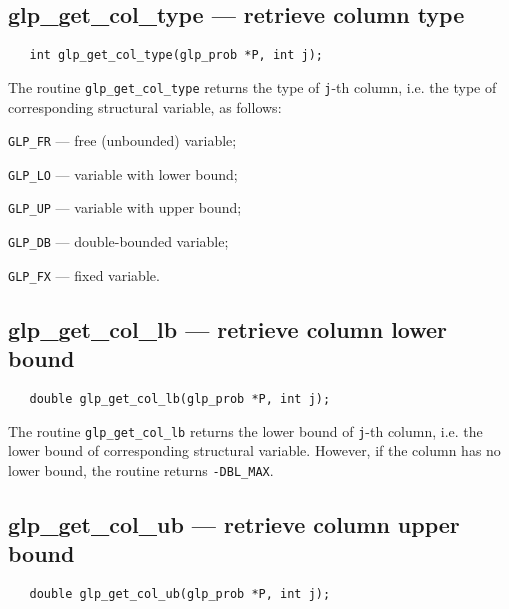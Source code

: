 \vspace*{-4pt}

\subsection{glp\_get\_col\_type --- retrieve column type}

\synopsis

\begin{verbatim}
   int glp_get_col_type(glp_prob *P, int j);
\end{verbatim}

\returns

The routine \verb|glp_get_col_type| returns the type of \verb|j|-th
column, i.e. the type of corresponding structural variable, as follows:

\verb|GLP_FR| --- free (unbounded) variable;

\verb|GLP_LO| --- variable with lower bound;

\verb|GLP_UP| --- variable with upper bound;

\verb|GLP_DB| --- double-bounded variable;

\verb|GLP_FX| --- fixed variable.

\vspace*{-4pt}

\subsection{glp\_get\_col\_lb --- retrieve column lower bound}

\synopsis

\begin{verbatim}
   double glp_get_col_lb(glp_prob *P, int j);
\end{verbatim}

\returns

The routine \verb|glp_get_col_lb| returns the lower bound of
\verb|j|-th column, i.e. the lower bound of corresponding structural
variable. However, if the column has no lower bound, the routine
returns \verb|-DBL_MAX|.

\subsection{glp\_get\_col\_ub --- retrieve column upper bound}

\synopsis

\begin{verbatim}
   double glp_get_col_ub(glp_prob *P, int j);
\end{verbatim}

